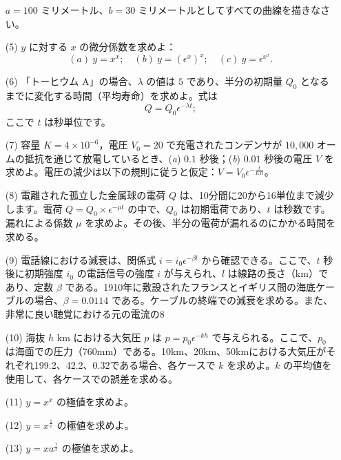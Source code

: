 \documentclass[a4paper,11pt,openany]{ltjsbook}
\begin{document}
\begin{enumerate}
\( a = 100 \) ミリメートル、\( b = 30 \) ミリメートルとしてすべての曲線を描きなさい。

\item[(5)] \( y \) に対する \( x \) の微分係数を求めよ：
\[
(\textit{a})~y = x^x;\quad
(\textit{b})~y = (\epsilon^x)^x;\quad
(\textit{c})~y = \epsilon^{x^x}.
\]

\item[(6)] 「トーヒウム A」の場合、\(\lambda\) の値は \( 5 \) であり、半分の初期量 \( Q_0 \) となるまでに変化する時間（平均寿命）を求めよ。式は
\[
Q = Q_0 \epsilon^{-\lambda t};
\]
ここで \( t \) は秒単位です。

\item[(7)] 容量 \( K = 4 \times  10^{-6} \)，電圧 \( V_0 = 20 \) で充電されたコンデンサが \( 10,000 \) オームの抵抗を通じて放電しているとき、(\textit{a}) \( 0.1 \) 秒後；(\textit{b}) \( 0.01 \) 秒後の電圧 \( V \) を求めよ。電圧の減少は以下の規則に従うと仮定：\( V = V_0 \epsilon^{-\frac{t}{KR}} \)。

\item[(8)] 電離された孤立した金属球の電荷 \( Q \) は、10分間に20から16単位まで減少します。電荷 \( Q = Q_0 \times \epsilon^{-\mu t} \) の中で、\( Q_0 \) は初期電荷であり、\( t \) は秒数です。漏れによる係数 \( \mu \) を求めよ。その後、半分の電荷が漏れるのにかかる時間を求める。

\item[(9)] 電話線における減衰は、関係式 \( i = i_0 \epsilon^{-\beta l} \) から確認できる。ここで、\( t \) 秒後に初期強度 \( i_0 \) の電話信号の強度 \( i \) が与えられ、\( l \) は線路の長さ（km）であり、定数 \(\beta\) である。1910年に敷設されたフランスとイギリス間の海底ケーブルの場合、\(\beta = 0.0114\) である。ケーブルの終端での減衰を求める。また、非常に良い聴覚における元の電流の8%

\item[(10)] 海抜 \( h \) km における大気圧 \( p \) は \( p = p_0 \epsilon^{-kh} \) で与えられる。ここで、\( p_0 \) は海面での圧力（760mm）である。10km、20km、50kmにおける大気圧がそれぞれ199.2、42.2、0.32である場合、各ケースで \( k \) を求めよ。\( k \) の平均値を使用して、各ケースでの誤差を求める。

\item[(11)] \( y = x^x \) の極値を求めよ。

\item[(12)] \( y = x^{\frac{1}{x}} \) の極値を求めよ。

\item[(13)] \( y = xa^{\frac{1}{x}} \) の極値を求めよ。

\end{enumerate}
\end{document}
